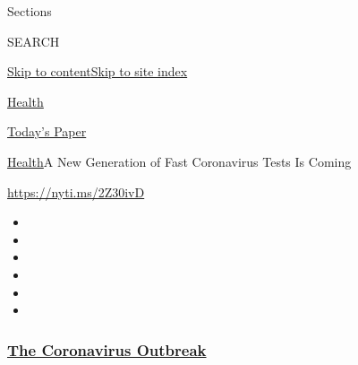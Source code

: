 Sections

SEARCH

\protect\hyperlink{site-content}{Skip to
content}\protect\hyperlink{site-index}{Skip to site index}

\href{https://www.nytimes3xbfgragh.onion/section/health}{Health}

\href{https://myaccount.nytimes3xbfgragh.onion/auth/login?response_type=cookie\&client_id=vi}{}

\href{https://www.nytimes3xbfgragh.onion/section/todayspaper}{Today's
Paper}

\href{/section/health}{Health}\textbar{}A New Generation of Fast
Coronavirus Tests Is Coming

\url{https://nyti.ms/2Z30ivD}

\begin{itemize}
\item
\item
\item
\item
\item
\item
\end{itemize}

\hypertarget{the-coronavirus-outbreak}{%
\subsubsection{\texorpdfstring{\href{https://www.nytimes3xbfgragh.onion/news-event/coronavirus?name=styln-coronavirus-national\&region=TOP_BANNER\&variant=undefined\&block=storyline_menu_recirc\&action=click\&pgtype=Article\&impression_id=5e38bc70-e38a-11ea-9e4d-7f40ba2d7eff}{The
Coronavirus
Outbreak}}{The Coronavirus Outbreak}}\label{the-coronavirus-outbreak}}

